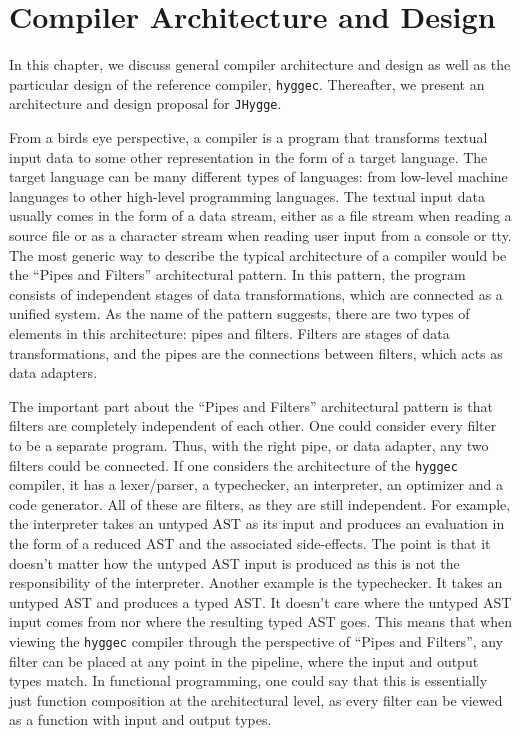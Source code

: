 \chapter{Compiler Architecture and Design}

In this chapter, we discuss general compiler architecture and design as well as the particular design of the reference compiler, \texttt{hyggec}.
Thereafter, we present an architecture and design proposal for \texttt{JHygge}.

From a birds eye perspective, a compiler is a program that transforms textual input data to some other representation in the form of a target language.
The target language can be many different types of languages: from low-level machine languages to other high-level programming languages.
The textual input data usually comes in the form of a data stream, either as a file stream when reading a source file or as a character stream when
reading user input from a console or tty. The most generic way to describe the typical architecture of a compiler would be the ``Pipes and Filters''
architectural pattern. In this pattern, the program consists of independent stages of data transformations, which are connected as a unified system.
As the name of the pattern suggests, there are two types of elements in this architecture: pipes and filters. Filters are stages of data transformations,
and the pipes are the connections between filters, which acts as data adapters.

The important part about the ``Pipes and Filters'' architectural pattern is that filters are completely independent of each other. One could consider
every filter to be a separate program. Thus, with the right pipe, or data adapter, any two filters could be connected. If one considers the architecture
of the \texttt{hyggec} compiler, it has a lexer/parser, a typechecker, an interpreter, an optimizer and a code generator. All of these are filters,
as they are still independent. For example, the interpreter takes an untyped AST as its input and produces an evaluation in the form of a reduced AST
and the associated side-effects. The point is that it doesn't matter how the untyped AST input is produced as this is not the responsibility of the
interpreter. Another example is the typechecker. It takes an untyped AST and produces a typed AST. It doesn't care where the untyped AST input comes
from nor where the resulting typed AST goes. This means that when viewing the \texttt{hyggec} compiler through the perspective of ``Pipes and Filters'',
any filter can be placed at any point in the pipeline, where the input and output types match. In functional programming, one could say that this is
essentially just function composition at the architectural level, as every filter can be viewed as a function with input and output types.

